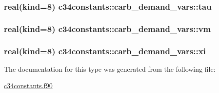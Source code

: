 \subsubsection[{tau}]{\setlength{\rightskip}{0pt plus 5cm}real(kind=8) c34constants\+::carb\+\_\+demand\+\_\+vars\+::tau}\label{structc34constants_1_1carb__demand__vars_ae138efc2c2eea80bf2149de470db7558}
\hypertarget{structc34constants_1_1carb__demand__vars_a64dcbcdfb1d4617b3a9c99f1657ec258}{}
\subsubsection[{vm}]{\setlength{\rightskip}{0pt plus 5cm}real(kind=8) c34constants\+::carb\+\_\+demand\+\_\+vars\+::vm}\label{structc34constants_1_1carb__demand__vars_a64dcbcdfb1d4617b3a9c99f1657ec258}
\hypertarget{structc34constants_1_1carb__demand__vars_afc5690ea0d855cce412210903bf987d7}{}
\subsubsection[{xi}]{\setlength{\rightskip}{0pt plus 5cm}real(kind=8) c34constants\+::carb\+\_\+demand\+\_\+vars\+::xi}\label{structc34constants_1_1carb__demand__vars_afc5690ea0d855cce412210903bf987d7}


The documentation for this type was generated from the following file\+:\begin{DoxyCompactItemize}
\item 
\hyperlink{c34constants_8f90}{c34constants.\+f90}\end{DoxyCompactItemize}
